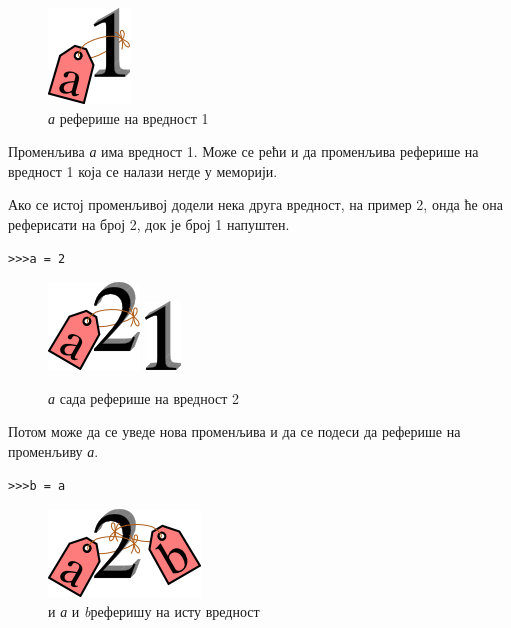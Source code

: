 \begin{figure}[here]
\centering
\includegraphics{1a.png}
\caption{\emph{а} реферише на вредност 1}
\label{slike:a_je_1}
\end{figure}

Променљива \emph{а} има вредност 1. Може се рећи и да променљива реферише на вредност 1 која се налази негде у меморији.

Ако се истој променљивој додели нека друга вредност, на пример 2, онда ће она реферисати на број 2, док је број 1 напуштен.

\begin{lstlisting}
>>>a = 2
\end{lstlisting}

\begin{figure}[here]
\centering
\includegraphics{2a.png}
\includegraphics{1.png}
\caption{\emph{а} сада реферише на вредност 2}
\label{slike:a_je_2}
\end{figure}

Потом може да се уведе нова променљива и да се подеси да реферише на променљиву \emph{а}.

\begin{lstlisting}
>>>b = a
\end{lstlisting}

\begin{figure} [here]
\centering
\includegraphics{2ab.png}
\caption{и \emph{а} и \emph{b}реферишу на исту вредност}
\label{slike:a_b_je_2}
\end{figure}

